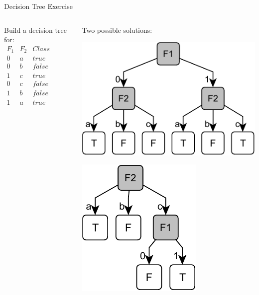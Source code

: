 \documentclass[14pt]{beamer}
\begin{document}
\begin{frame}[label=decision-tree-exercise]{Decision Tree Exercise}
	\begin{columns}
		\begin{column}{1.8in}
			Build a decision tree for: \\
			\bigskip
			$
			\begin{array}{ll|l}
				F_1 & F_2 & \textit{Class} \\
				\hline
				0   & a   & \textit{true} \\
				0   & b   & \textit{false} \\
				1   & c   & \textit{true} \\
				0   & c   & \textit{false} \\
				1   & b   & \textit{false} \\
				1   & a   & \textit{true} \\
			\end{array}
			$
		\end{column}
		\pause
		\begin{column}{1.8in}
			Two possible solutions:
		
			\centering
			\bigskip
			\includegraphics[scale=.6]{exercise-1}
			
			\bigskip
			\includegraphics[scale=.6]{exercise-2}
		\end{column}
	\end{columns}
\end{frame}
\end{document}
